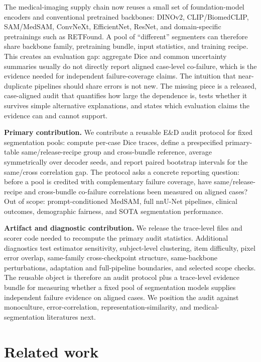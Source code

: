 \documentclass{article}
\begin{document}
The medical-imaging supply chain now reuses a small set of foundation-model encoders and conventional pretrained backbones: DINOv2, CLIP/BiomedCLIP, SAM/MedSAM, ConvNeXt, EfficientNet, ResNet, and domain-specific pretrainings such as RETFound. A pool of ``different'' segmenters can therefore share backbone family, pretraining bundle, input statistics, and training recipe. This creates an evaluation gap: aggregate Dice and common uncertainty summaries usually do not directly report aligned case-level co-failure, which is the evidence needed for independent failure-coverage claims. The intuition that near-duplicate pipelines should share errors is not new. The missing piece is a released, case-aligned audit that quantifies how large the dependence is, tests whether it survives simple alternative explanations, and states which evaluation claims the evidence can and cannot support.

\textbf{Primary contribution.} We contribute a reusable E\&D audit protocol for fixed segmentation pools: compute per-case Dice traces, define a prespecified primary-table same/release-recipe group and cross-bundle reference, average symmetrically over decoder seeds, and report paired bootstrap intervals for the same/cross correlation gap. The protocol asks a concrete reporting question: before a pool is credited with complementary failure coverage, have same/release-recipe and cross-bundle co-failure correlations been measured on aligned cases? Out of scope: prompt-conditioned MedSAM, full nnU-Net pipelines, clinical outcomes, demographic fairness, and SOTA segmentation performance.

\textbf{Artifact and diagnostic contribution.} We release the trace-level files and scorer code needed to recompute the primary audit statistics. Additional diagnostics test estimator sensitivity, subject-level clustering, item difficulty, pixel error overlap, same-family cross-checkpoint structure, same-backbone perturbations, adaptation and full-pipeline boundaries, and selected scope checks. The reusable object is therefore an audit protocol plus a trace-level evidence bundle for measuring whether a fixed pool of segmentation models supplies independent failure evidence on aligned cases. We position the audit against monoculture, error-correlation, representation-similarity, and medical-segmentation literatures next.

\section{Related work}
\label{sec:related}
\end{document}
